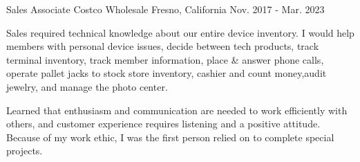 \begin{cventries}
	\cventry
	{Sales Associate} %
	{Costco Wholesale} %
	{Fresno, California} %
	{Nov. 2017 - Mar. 2023} %
	{
		\begin{cvitems} %
		\item {Sales required technical knowledge about our entire device inventory. I would help members with personal device issues, decide between tech products, track terminal inventory, track member information, place \& answer phone calls, operate pallet jacks to stock store inventory, cashier and count money,audit jewelry, and manage the photo center.}
		\item {Learned that enthusiasm and communication are needed to work efficiently with others, and customer experience requires listening and a positive attitude. Because of my work ethic, I was the first person relied on to complete special projects.} 
		\end{cvitems}
	}
\end{cventries}

